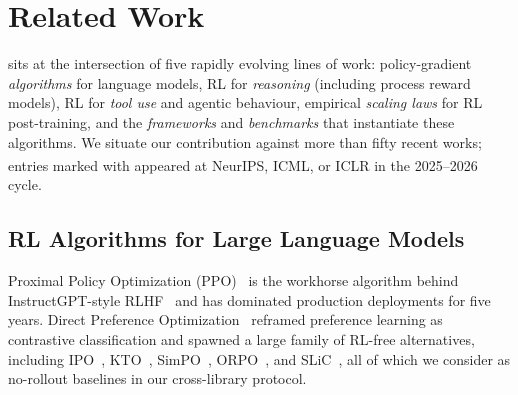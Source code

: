 
\section{Related Work}
\label{sec:related}

\ours{} sits at the intersection of five rapidly evolving lines of work:
policy-gradient \emph{algorithms} for language models, RL for \emph{reasoning}
(including process reward models), RL for \emph{tool use} and agentic behaviour,
empirical \emph{scaling laws} for RL post-training, and the \emph{frameworks}
and \emph{benchmarks} that instantiate these algorithms. We situate our
contribution against more than fifty recent works; entries marked with
\textsuperscript{\dag} appeared at NeurIPS, ICML, or ICLR in the 2025--2026 cycle.

\subsection{RL Algorithms for Large Language Models}
\label{sec:related:algos}

Proximal Policy Optimization (PPO)~\cite{schulman2017proximal} is the workhorse
algorithm behind InstructGPT-style RLHF~\cite{ouyang2022training,
christiano2017deeprlhf, stiennon2020summarize, bai2022hhrlhf, bai2022claudecai}
and has dominated production deployments for five years. Direct Preference
Optimization~\cite{rafailov2024direct} reframed preference learning as
contrastive classification and spawned a large family of RL-free alternatives,
including IPO~\cite{azar2024ipo}, KTO~\cite{ethayarajh2024kto},
SimPO~\cite{meng2024simpo}, ORPO~\cite{hong2024orpo}, and
SLiC~\cite{zhao2023slic}, all of which we consider as no-rollout baselines in
our cross-library protocol.


